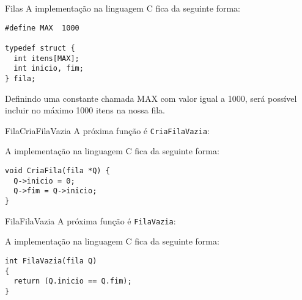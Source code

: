 \documentclass[aspectratio=169]{beamer}
\begin{document}

\begin{frame}[fragile]{Filas}
A implementação na linguagem C fica da seguinte forma:

\begin{lstlisting}[style=CStyle]
#define MAX  1000

typedef struct {
  int itens[MAX];
  int inicio, fim;
} fila;
\end{lstlisting}  
Definindo uma constante chamada MAX com valor igual a 1000, será possível incluir no máximo 1000 itens na nossa fila.
\end{frame}


\begin{frame}[fragile]{Fila}{CriaFilaVazia}
A próxima função é \verb|CriaFilaVazia|:
\begin{algorithm}[H]
\caption{CriaFilaVazia} 
\label{CriaFilaVazia}
\end{algorithm} 
A implementação na linguagem C fica da seguinte forma:

\begin{lstlisting}[style=CStyle]
void CriaFila(fila *Q) { 
  Q->inicio = 0;
  Q->fim = Q->inicio;
} 
\end{lstlisting}  

\end{frame}



\begin{frame}[fragile]{Fila}{FilaVazia}
A próxima função é \verb|FilaVazia|:
\begin{algorithm}[H]
\caption{FilaVazia} 
\label{FilaVazia}
\end{algorithm}
A implementação na linguagem C fica da seguinte forma:

\begin{lstlisting}[style=CStyle]
int FilaVazia(fila Q)
{ 
  return (Q.inicio == Q.fim); 
} 
\end{lstlisting}  

\end{frame}
\end{document}

